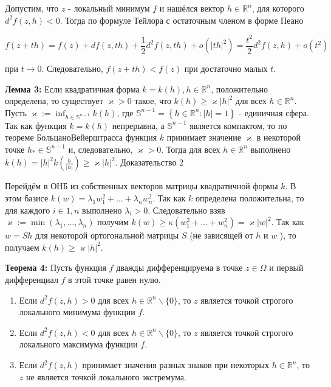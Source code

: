 \documentclass[a4paper,12pt]{article} %
\begin{document}
Допустим, что $z$ - локальный минимум $f$ и нашёлся вектор $h \in \mathbb{R}^{n}$, для которого $d^{2} f(z, h)<0$. Тогда по формуле Тейлора с остаточным членом в форме Пеано

$$
f(z+t h)=f(z)+d f(z, t h)+\frac{1}{2} d^{2} f(z, t h)+o\left(|t h|^{2}\right)=\frac{t^{2}}{2} d^{2} f(z, h)+o\left(t^{2}\right)
$$

при $t \rightarrow 0$. Следовательно, $f(z+t h)<f(z)$ при достаточно малых $t$.

\textbf{Лемма 3:} Если квадратичная форма $k=k(h), h \in \mathbb{R}^{n}$, положительно определена, то существует $\varkappa>0$ такое, что $k(h) \geq \varkappa|h|^{2}$ для всех $h \in \mathbb{R}^{n}$. Пусть $\varkappa:=\inf _{h \in \mathbb{S}^{n-1}} k(h)$, где $\mathbb{S}^{n-1}=\left\{h \in \mathbb{R}^{n}:|h|=1\right\}$ - единичная сфера. Так как функция $k=k(h)$ непрерывна, а $\mathbb{S}^{n-1}$ является компактом, то по теореме БольцаноВейерштрасса функция $k$ принимает значение $\varkappa$ в некоторой точке $h_{*} \in \mathbb{S}^{n-1}$ и, следовательно, $\varkappa>0$. Тогда для всех $h \in \mathbb{R}^{n}$ выполнено $k(h)=|h|^{2} k\left(\frac{h}{|h|}\right) \geq \varkappa|h|^{2}$. Доказательство 2

Перейдём в ОНБ из собственных векторов матрицы квадратичной формы $k$. В этом базисе $k(w)=\lambda_{1} w_{1}^{2}+\ldots+\lambda_{n} w_{n}^{2}$. Так как $k$ определена положительна, то для каждого $i \in \overline{1, n}$ выполнено $\lambda_{i}>0$. Следовательно взяв $\varkappa:=\min \left(\lambda_{1}, \ldots, \lambda_{n}\right)$ получим $k(w) \geq \kappa\left(w_{1}^{2}+\ldots+w_{n}^{2}\right)=\varkappa|w|^{2}$. Так как $w=S h$ для некоторой ортогональной матрицы $S$ (не зависящей от $h$ и $w$ ), то получаем $k(h) \geq \varkappa|h|^{2}$.

\textbf{Теорема 4:} Пусть функция $f$ дважды дифференцируема в точке $z \in \Omega$ и первый дифференциал $f$ в этой точке равен нулю.

\begin{enumerate}
\item Если $d^{2} f(z, h)>0$ для всех $h \in \mathbb{R}^{n} \backslash\{0\}$, то $z$ является точкой строгого локального минимума функции $f$.

\item Если $d^{2} f(z, h)<0$ для всех $h \in \mathbb{R}^{n} \backslash\{0\}$, то $z$ является точкой строгого локального максимума функции $f$.

\item Если $d^{2} f(z, h)$ принимает значения разных знаков при некоторых $h \in \mathbb{R}^{n}$, то $z$ не является точкой локального экстремума.

\end{enumerate}
\end{document}
